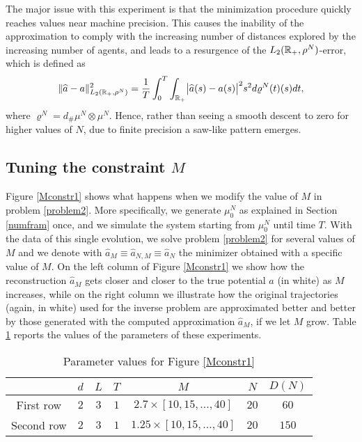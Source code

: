 The major issue with this experiment is that the minimization procedure quickly reaches values near machine precision. This causes the inability of the approximation to comply with the increasing number of distances explored by the increasing number of agents, and leads to a resurgence of the $L_2(\mathbb{R}_+,\rho^N)$-error, which is defined as
\begin{align}
	\|\widehat a-a\|^2_{L_2(\mathbb{R}_+,\rho^N)} = \frac{1}{T}\int_0^T\int_{\mathbb{R}_+}\bigl|\widehat a(s)-a(s)\bigr|^2 s^2 d\varrho^N(t)(s) dt,
\end{align}
where $\varrho^N = d_\# \mu^N \otimes \mu^N$.
Hence, rather than seeing a smooth descent to zero for higher values of $N$, due to finite precision a saw-like pattern emerges.

\subsection{Tuning the constraint $M$}

Figure \ref{Mconstr1} shows what happens when we modify the value of $M$ in problem \eqref{problem2}. More specifically, we generate $\mu^N_0$ as explained in Section \ref{numfram} once, and we simulate the system starting from $\mu^N_0$ until time $T$. With the data of this single evolution, we solve problem \eqref{problem2} for several values of $M$ and we denote with $\widehat{a}_M \equiv \widehat{a}_{N,M} \equiv \widehat{a}_{N}$ the minimizer obtained with a specific value of $M$. On the left column of Figure \ref{Mconstr1} we show how the reconstruction $\widehat{a}_M$ gets closer and closer to the true potential $a$ (in white) as $M$ increases, while on the right column we illustrate how the original trajectories (again, in white) used for the inverse problem are approximated better and better by those generated with the computed approximation $\widehat{a}_M$, if we let $M$ grow. Table \ref{tab:figM} reports the values of the parameters of these experiments.

\begin{table}[h]
\begin{center}
\begin{tabular}{ |c|c|c|c|c|c|c| }
\hline
 & $d$ & $L$ & $T$ & $M$ & $N$ & $D(N)$ \\
\hline
\hline
 First row & $2$ & $3$ & $1$ & $2.7 \times [10,15,\ldots,40]$ & $20$ & $60$ \\
\hline
 Second row & $2$ & $3$ & $1$ & $1.25 \times [10,15,\ldots,40]$ & $20$ & $150$ \\
\hline
\end{tabular}
\end{center}
\vspace{-0.5cm}
\caption{Parameter values for Figure \ref{Mconstr1}} \label{tab:figM} 
\end{table}


